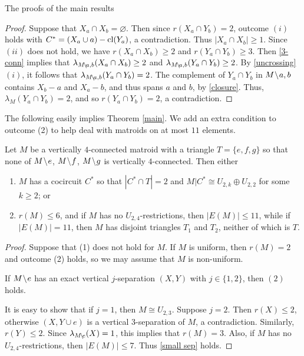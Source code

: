 \documentclass[12pt]{amsart}
\begin{document}
\begin{section}{The proofs of the main results}
\begin{proof}
Suppose that $X_a \cap X_b = \varnothing$.
Then since $r(X_a \cap Y_b) = 2$, outcome $(i)$ holds with $C^* = (X_a \cup a) - \operatorname{cl}(Y_a)$, a contradiction.
Thus $|X_a \cap X_b| \ge 1$.
Since $(ii)$ does not hold, we have $r(X_a \cap X_b) \ge 2$ and $r(Y_a \cap Y_b) \ge 3$.
Then \ref{3-conn} implies that $\lambda_{M \!\setminus\! a,b}(X_a \cap X_b) \ge 2$ and $\lambda_{M \!\setminus\! a,b}(Y_a \cap Y_b) \ge 2$.
By \ref{uncrossing}$(i)$, it follows that $\lambda_{M \!\setminus\! a,b}(Y_a \cap Y_b) = 2$.
The complement of $Y_a \cap Y_b$ in $M \!\setminus\! a,b$ contains $X_b - a$ and $X_a - b$, and thus spans $a$ and $b$, by \ref{closure}.
Thus, $\lambda_M(Y_a \cap Y_b) = 2$, and so $r(Y_a \cap Y_b) = 2$, a contradiction.
\end{proof}






The following easily implies Theorem \ref{main}. 
We add an extra condition to outcome (2) to help deal with matroids on at most $11$ elements.

\begin{theorem} \label{main extra}
Let $M$ be a vertically $4$-connected matroid with a triangle $T = \{e,f,g\}$ so that none of $M\!\setminus\! e$, $M \!\setminus\! f$, $M \!\setminus\! g$ is vertically $4$-connected.
Then either
\begin{enumerate}[$(1)$]
\item $M$ has a cocircuit $C^*$ so that $|C^* \cap T| = 2$ and $M|C^* \cong U_{2,k} \oplus U_{2,2}$ for some $k \ge 2$; or

\item $r(M) \le 6$, and if $M$ has no $U_{2,4}$-restrictions, then $|E(M)| \le 11$, while if $|E(M)| = 11$, then $M$ has disjoint triangles $T_1$ and $T_2$, neither of which is $T$.
\end{enumerate}
\end{theorem}
\begin{proof}
Suppose that (1) does not hold for $M$.
If $M$ is uniform, then $r(M) = 2$ and outcome (2) holds, so we may assume that $M$ is non-uniform.

\begin{claim} \label{small sep}
If $M \!\setminus\! e$ has an exact vertical $j$-separation $(X,Y)$ with $j \in \{1,2\}$, then $(2)$ holds.
\end{claim}
It is easy to show that if $j = 1$, then $M \cong U_{2,3}$.
Suppose $j = 2$.
Then $r(X) \le 2$, otherwise $(X, Y \cup e)$ is a vertical $3$-separation of $M$, a contradiction.
Similarly, $r(Y) \le 2$.
Since $\lambda_{M \!\setminus\! e}(X) = 1$, this implies that $r(M) = 3$.
Also, if $M$ has no $U_{2,4}$-restrictions, then $|E(M)| \le 7$.
Thus \ref{small sep} holds.



\end{proof}
\end{section}
\end{document}
